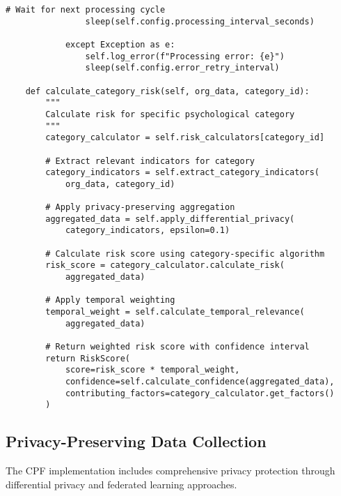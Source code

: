 \documentclass[10pt,twocolumn]{IEEEtran}
\begin{document}
\begin{lstlisting}[caption={Real-Time CPF Processing Engine}]
                # Wait for next processing cycle
                sleep(self.config.processing_interval_seconds)
                
            except Exception as e:
                self.log_error(f"Processing error: {e}")
                sleep(self.config.error_retry_interval)
    
    def calculate_category_risk(self, org_data, category_id):
        """
        Calculate risk for specific psychological category
        """
        category_calculator = self.risk_calculators[category_id]
        
        # Extract relevant indicators for category
        category_indicators = self.extract_category_indicators(
            org_data, category_id)
        
        # Apply privacy-preserving aggregation
        aggregated_data = self.apply_differential_privacy(
            category_indicators, epsilon=0.1)
        
        # Calculate risk score using category-specific algorithm
        risk_score = category_calculator.calculate_risk(
            aggregated_data)
        
        # Apply temporal weighting
        temporal_weight = self.calculate_temporal_relevance(
            aggregated_data)
        
        # Return weighted risk score with confidence interval
        return RiskScore(
            score=risk_score * temporal_weight,
            confidence=self.calculate_confidence(aggregated_data),
            contributing_factors=category_calculator.get_factors()
        )
\end{lstlisting}

\subsection{Privacy-Preserving Data Collection}

The CPF implementation includes comprehensive privacy protection through differential privacy and federated learning approaches.
\end{document}
